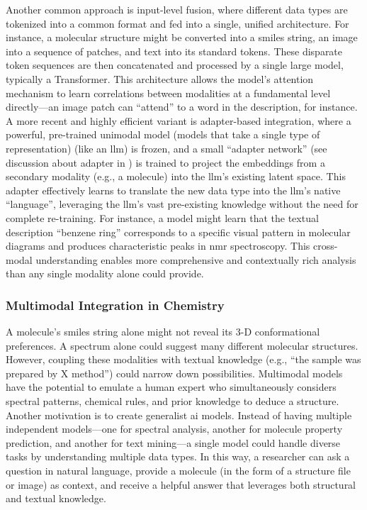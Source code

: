 Another common approach is input-level fusion, where different data types are tokenized into a common format and fed into a single, unified architecture. 
For instance, a molecular structure might be converted into a \gls{smiles} string, an image into a sequence of patches, and text into its standard tokens. These disparate token sequences are then concatenated and processed by a single large model, typically a Transformer. 
This architecture allows the model's attention mechanism to learn correlations between modalities at a fundamental level directly---an image patch can \enquote{attend} to a word in the description, for instance. 
A more recent and highly efficient variant is adapter-based integration, where a powerful, pre-trained unimodal model (models that take a single type of representation) (like an \gls{llm}) is frozen, and a small \enquote{adapter network} (see discussion about adapter in ) is trained to project the embeddings from a secondary modality (e.g., a molecule) into the \gls{llm}'s existing latent space. 
This adapter effectively learns to translate the new data type into the \gls{llm}'s native \enquote{language}, leveraging the \gls{llm}'s vast pre-existing knowledge without the need for complete re-training. 
For instance, a model might learn that the textual description \enquote{benzene ring} corresponds to a specific visual pattern in molecular diagrams and produces characteristic peaks in \gls{nmr} spectroscopy. 
This cross-modal understanding enables more comprehensive and contextually rich analysis than any single modality alone could provide.

\subsubsection{Multimodal Integration in Chemistry}\label{sec:multimodal_chem}

A molecule’s \gls{smiles} string alone might not reveal its 3-D conformational preferences. 
A spectrum alone could suggest many different molecular structures. 
However, coupling these modalities with textual knowledge (e.g., \enquote{the sample was prepared by X method}) could narrow down possibilities. 
Multimodal models have the potential to emulate a human expert who simultaneously considers spectral patterns, chemical rules, and prior knowledge to deduce a structure. 
Another motivation is to create generalist \gls{ai} models. 
Instead of having multiple independent models---one for spectral analysis, another for molecule property prediction, and another for text mining---a single model could handle diverse tasks by understanding multiple data types.
In this way, a researcher can ask a question in natural language, provide a molecule (in the form of a structure file or image) as context, and receive a helpful answer that leverages both structural and textual knowledge.

